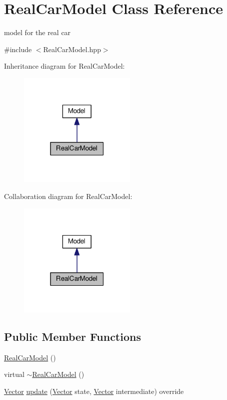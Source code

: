 \hypertarget{classRealCarModel}{}\section{Real\+Car\+Model Class Reference}
\label{classRealCarModel}


model for the real car  




{\ttfamily \#include $<$Real\+Car\+Model.\+hpp$>$}



Inheritance diagram for Real\+Car\+Model\+:\nopagebreak
\begin{figure}[H]
\begin{center}
\leavevmode
\includegraphics[width=159pt]{classRealCarModel__inherit__graph}
\end{center}
\end{figure}


Collaboration diagram for Real\+Car\+Model\+:\nopagebreak
\begin{figure}[H]
\begin{center}
\leavevmode
\includegraphics[width=159pt]{classRealCarModel__coll__graph}
\end{center}
\end{figure}
\subsection*{Public Member Functions}
\begin{DoxyCompactItemize}
\item 
\hyperlink{classRealCarModel_a5bb463d2448f307373b32a1f7d9254ec}{Real\+Car\+Model} ()
\item 
virtual \hyperlink{classRealCarModel_aa5e4c05702b96208a2f272d1c4cbf4e7}{$\sim$\+Real\+Car\+Model} ()
\item 
\hyperlink{Agent_8hpp_a5dd127bb3cb18b011cf5fd80a906e830}{Vector} \hyperlink{classRealCarModel_a4437d9515709862a19fdd5f7e828d757}{update} (\hyperlink{Agent_8hpp_a5dd127bb3cb18b011cf5fd80a906e830}{Vector} state, \hyperlink{Agent_8hpp_a5dd127bb3cb18b011cf5fd80a906e830}{Vector} intermediate) override
\end{DoxyCompactItemize}
